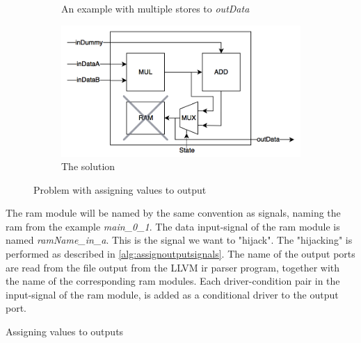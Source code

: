 \begin{figure}[hbpt]
\begin{subfigure}{0.49\textwidth}
                \caption{An example with multiple stores to \textit{outData}}
  \label{fig:assignoutputs3}
       \end{subfigure}%
    \hfill
        \begin{subfigure}{0.49\textwidth}\centering
                    \includegraphics[width=\linewidth]{figs/OutputAssignment4.png}
                \caption{The solution}
  \label{fig:assignoutputs4}
       \end{subfigure}%
\caption{\label{fig:assigningoutputs}Problem with assigning values to output}
\end{figure}
The \gls{ram} module will be named by the same convention as signals, naming the \gls{ram} from the example \textit{main\_0\_1}. The data input-signal of the \gls{ram} module is named \textit{ramName\_in\_a}. This is the signal we want to "hijack". The "hijacking" is performed as described in \cref{alg:assignoutputsignals}. The name of the output ports are read from the file output from the LLVM \gls{ir} parser program, together with the name of the corresponding \gls{ram} modules. Each driver-condition pair in the input-signal of the \gls{ram} module, is added as a conditional driver to the output port.
\makeatletter
\let\OldStatex\Statex
\renewcommand{\Statex}[1][3]{%
  \setlength\@tempdima{\algorithmicindent}%
  \OldStatex\hskip\dimexpr#1\@tempdima\relax}
\makeatother
\begin{algorithm}
  \caption{Assigning values to outputs
  \label{alg:assignoutputsignals}}
\end{algorithm}

